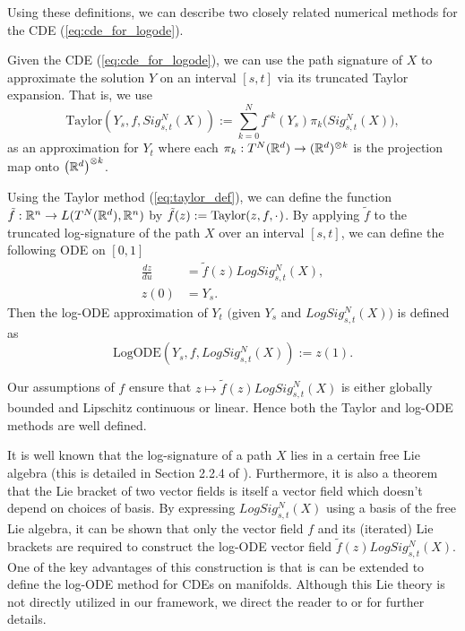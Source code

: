 Using these definitions, we can describe two closely related numerical methods for the CDE (\ref{eq:cde_for_logode}).\smallbreak

\begin{definition} Given the CDE (\ref{eq:cde_for_logode}), we can use the path signature of $X$ to approximate the solution $Y$ on an interval $[s,t]$ via its truncated Taylor expansion. That is, we use
\begin{equation}
\text{Taylor}(Y_s, f, Sig_{s,t}^N(X)) := \sum_{k=0}^N f^{\circ k}(Y_s)\pi_k \big(Sig_{s,t}^N(X)\big),
\label{eq:taylor_def}
\end{equation}
as an approximation for $Y_t$ where each $\pi_k : T^N(\mathbb{R}^d)\rightarrow (\mathbb{R}^d)^{\otimes k}$ is the projection map onto $\big(\mathbb{R}^d\big)^{\otimes k}$.
\end{definition}\medbreak

\begin{definition}\label{def:logode} Using the Taylor method (\ref{eq:taylor_def}), we can define the function $\tilde{f} : \mathbb{R}^n \rightarrow L(T^N(\mathbb{R}^d), \mathbb{R}^n)$ by $\tilde{f}(z) := \text{Taylor}(z, f, \cdot\hspace{0.25mm})$. By applying $\tilde{f}$ to the truncated log-signature of the path $X$ over an interval $[s,t]$, we can define the following ODE on $[0,1]$
\begin{align}
\frac{dz}{du} & = \tilde{f}(z)LogSig_{s,t}^N(X),\label{eq:first_logode_def}\\[3pt]
z(0) & = Y_s.\nonumber
\end{align}
Then the log-ODE approximation of $Y_t$ $($given $Y_s$ and $LogSig_{s,t}^N(X))$ is defined as
\begin{equation}
\text{LogODE}(Y_s, f, LogSig_{s,t}^N(X)) := z(1).
\label{eq:second_logode_def}
\end{equation}
\end{definition}
\begin{remark}
Our assumptions of $f$ ensure that $z\mapsto\tilde{f}(z)LogSig_{s,t}^N(X)$ is either globally bounded and Lipschitz continuous or linear. Hence both the Taylor and log-ODE methods are well defined.
\end{remark}
\begin{remark}
It is well known that the log-signature of a path $X$ lies in a certain free Lie algebra (this is detailed in Section 2.2.4 of \cite{roughpath2007notes}). Furthermore, it is also a theorem that the Lie bracket of two vector fields is itself a vector field which doesn't depend on choices of basis.
By expressing $LogSig_{s,t}^N(X)$ using a basis of the free Lie algebra, it can be shown that only the vector field $f$ and its (iterated) Lie brackets are required to construct the log-ODE vector field $\tilde{f}(z)LogSig_{s,t}^N(X)$. One of the key advantages of this construction is that is can be extended to define the log-ODE method for CDEs on manifolds. Although this Lie theory is not directly utilized in our framework, we direct the reader to \cite{lyons2014streams} or \cite{logode2014estimate} for further details.
\end{remark}

